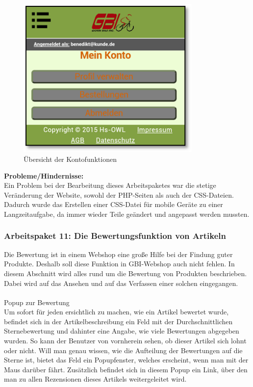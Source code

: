 \begin{figure}[H]
\begin{center}
\includegraphics[height=8cm]{Bilder/Michael_Abbildung9-UebersichtDerKontofunktionen.png}
\end{center}
\caption{Übersicht der Kontofunktionen}
\end{figure}

\newpage
\textbf{Probleme/Hindernisse:}
\\
Ein Problem bei der Bearbeitung dieses Arbeitspaketes war die stetige Veränderung der Website, sowohl der PHP-Seiten als auch der CSS-Dateien. Dadurch wurde das Erstellen einer CSS-Datei für mobile Geräte zu einer Langzeitaufgabe, da immer wieder Teile geändert und angepasst werden mussten. 


\subsubsection{Arbeitspaket 11: Die Bewertungsfunktion von Artikeln}

Die Bewertung ist in einem Webshop eine große Hilfe bei der Findung guter Produkte. Deshalb soll diese Funktion in GBI-Webshop auch nicht fehlen. 
In diesem Abschnitt wird alles rund um die Bewertung von Produkten beschrieben. Dabei wird auf das Ansehen und auf das Verfassen einer solchen eingegangen.
\\ \\
Popup zur Bewertung
\\
Um sofort für jeden ersichtlich zu machen, wie ein Artikel bewertet wurde, befindet sich in der Artikelbeschreibung ein Feld mit der Durchschnittlichen Sternebewertung und dahinter eine Angabe, wie viele Bewertungen abgegeben wurden. So kann der Benutzer von vornherein sehen, ob dieser Artikel sich lohnt oder nicht. Will man genau wissen, wie die Aufteilung der Bewertungen auf die Sterne ist, bietet das Feld ein Popupfenster, welches erscheint, wenn man mit der Maus darüber fährt. Zusätzlich befindet sich in diesem Popup ein Link, über den man zu allen Rezensionen dieses Artikels weitergeleitet wird.

